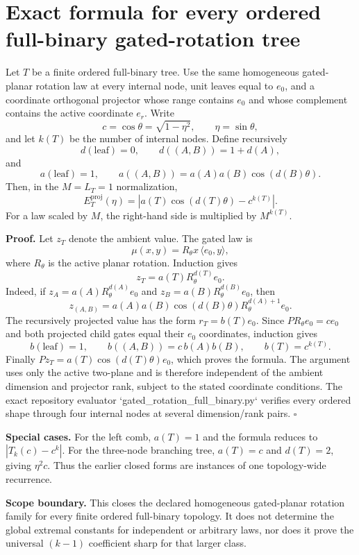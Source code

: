 \section*{Exact formula for every ordered full-binary gated-rotation tree}
\label{sec:gated-rotation-full-binary}

Let $T$ be a finite ordered full-binary tree.  Use the same homogeneous
gated-planar rotation law at every internal node, unit leaves equal to $e_0$,
and a coordinate orthogonal projector whose range contains $e_0$ and whose
complement contains the active coordinate $e_r$.  Write
\[
  c=\cos\theta=\sqrt{1-\eta^2},
  \qquad \eta=\sin\theta,
\]
and let $k(T)$ be the number of internal nodes.  Define recursively
\[
  d(\text{leaf})=0, \qquad
  d((A,B))=1+d(A),
\]
and
\[
  a(\text{leaf})=1, \qquad
  a((A,B))=a(A)a(B)\cos(d(B)\theta).
\]
Then, in the $M=L_T=1$ normalization,
\[
  \boxed{
  E_T^{\mathrm{proj}}(\eta)=
  \left|a(T)\cos(d(T)\theta)-c^{k(T)}\right|.
  }
\]
For a law scaled by $M$, the right-hand side is multiplied by $M^{k(T)}$.

\textbf{Proof.}  Let $z_T$ denote the ambient value.  The gated law is
\[
  \mu(x,y)=R_\theta x\,\langle e_0,y\rangle,
\]
where $R_\theta$ is the active planar rotation.  Induction gives
\[
  z_T=a(T)R_\theta^{d(T)}e_0.
\]
Indeed, if $z_A=a(A)R_\theta^{d(A)}e_0$ and
$z_B=a(B)R_\theta^{d(B)}e_0$, then
\[
  z_{(A,B)}=a(A)a(B)\cos(d(B)\theta)
  R_\theta^{d(A)+1}e_0.
\]
The recursively projected value has the form $r_T=b(T)e_0$.  Since
$P R_\theta e_0=c e_0$ and both projected child gates equal their $e_0$
coordinates, induction gives
\[
  b(\text{leaf})=1, \qquad b((A,B))=c\,b(A)b(B),
  \qquad b(T)=c^{k(T)}.
\]
Finally $Pz_T=a(T)\cos(d(T)\theta)e_0$, which proves the formula.
The argument uses only the active two-plane and is therefore independent of
the ambient dimension and projector rank, subject to the stated coordinate
conditions.  The exact repository evaluator
`gated_rotation_full_binary.py` verifies every ordered shape through four
internal nodes at several dimension/rank pairs.  $\square$

\textbf{Special cases.}  For the left comb, $a(T)=1$ and the formula reduces
to $|T_k(c)-c^k|$.  For the three-node branching tree,
$a(T)=c$ and $d(T)=2$, giving $\eta^2c$.  Thus the earlier closed forms are
instances of one topology-wide recurrence.

\textbf{Scope boundary.}  This closes the declared homogeneous gated-planar
rotation family for every finite ordered full-binary topology.  It does not
determine the global extremal constants for independent or arbitrary laws,
nor does it prove the universal $(k-1)$ coefficient sharp for that larger
class.
